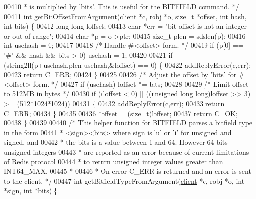 \begin{DoxyCode}
{00410 \textcolor{comment}{ * is multiplied by 'bits'. This is useful for the BITFIELD command. */}
00411 \textcolor{keywordtype}{int} getBitOffsetFromArgument(\hyperlink{structclient}{client} *c, robj *o, size\_t *offset, \textcolor{keywordtype}{int} hash, \textcolor{keywordtype}{int} bits) \{
00412     \textcolor{keywordtype}{long} \textcolor{keywordtype}{long} loffset;
00413     \textcolor{keywordtype}{char} *err = \textcolor{stringliteral}{"bit offset is not an integer or out of range"};
00414     \textcolor{keywordtype}{char} *p = o->ptr;
00415     size\_t plen = sdslen(p);
00416     \textcolor{keywordtype}{int} usehash = 0;
00417 
00418     \textcolor{comment}{/* Handle #<offset> form. */}
00419     \textcolor{keywordflow}{if} (p[0] == \textcolor{stringliteral}{'#'} && hash && bits > 0) usehash = 1;
00420 
00421     \textcolor{keywordflow}{if} (string2ll(p+usehash,plen-usehash,&loffset) == 0) \{
00422         addReplyError(c,err);
00423         \textcolor{keywordflow}{return} \hyperlink{server_8h_af98ac28d5f4d23d7ed5985188e6fb7d1}{C\_ERR};
00424     \}
00425 
00426     \textcolor{comment}{/* Adjust the offset by 'bits' for #<offset> form. */}
00427     \textcolor{keywordflow}{if} (usehash) loffset *= bits;
00428 
00429     \textcolor{comment}{/* Limit offset to 512MB in bytes */}
00430     \textcolor{keywordflow}{if} ((loffset < 0) || ((\textcolor{keywordtype}{unsigned} \textcolor{keywordtype}{long} \textcolor{keywordtype}{long})loffset >> 3) >= (512*1024*1024))
00431     \{
00432         addReplyError(c,err);
00433         \textcolor{keywordflow}{return} \hyperlink{server_8h_af98ac28d5f4d23d7ed5985188e6fb7d1}{C\_ERR};
00434     \}
00435 
00436     *offset = (size\_t)loffset;
00437     \textcolor{keywordflow}{return} \hyperlink{server_8h_a303769ef1065076e68731584e758d3e1}{C\_OK};
00438 \}
00439 
00440 \textcolor{comment}{/* This helper function for BITFIELD parses a bitfield type in the form}
00441 \textcolor{comment}{ * <sign><bits> where sign is 'u' or 'i' for unsigned and signed, and}
00442 \textcolor{comment}{ * the bits is a value between 1 and 64. However 64 bits unsigned integers}
00443 \textcolor{comment}{ * are reported as an error because of current limitations of Redis protocol}
00444 \textcolor{comment}{ * to return unsigned integer values greater than INT64\_MAX.}
00445 \textcolor{comment}{ *}
00446 \textcolor{comment}{ * On error C\_ERR is returned and an error is sent to the client. */}
00447 \textcolor{keywordtype}{int} getBitfieldTypeFromArgument(\hyperlink{structclient}{client} *c, robj *o, \textcolor{keywordtype}{int} *sign, \textcolor{keywordtype}{int} *bits) \{
}
\end{DoxyCode}
